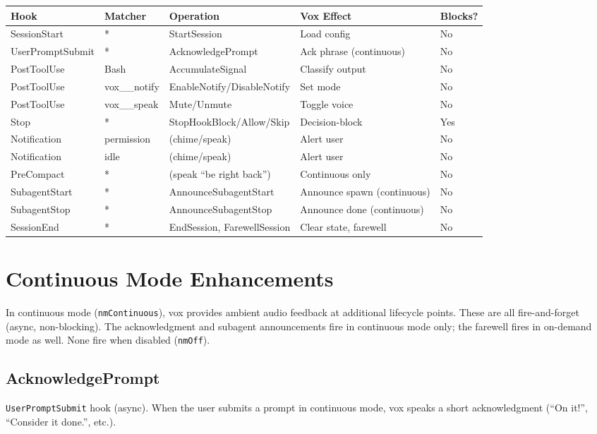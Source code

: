 \documentclass[a4paper,10pt,fleqn]{article}
\begin{document}
\begin{tabular}{lllll}
\hline
\textbf{Hook} & \textbf{Matcher} & \textbf{Operation} & \textbf{Vox Effect} & \textbf{Blocks?} \\
\hline
SessionStart & * & StartSession & Load config & No \\
UserPromptSubmit & * & AcknowledgePrompt & Ack phrase (continuous) & No \\
PostToolUse & Bash & AccumulateSignal & Classify output & No \\
PostToolUse & vox\_\_notify & EnableNotify/DisableNotify & Set mode & No \\
PostToolUse & vox\_\_speak & Mute/Unmute & Toggle voice & No \\
Stop & * & StopHookBlock/Allow/Skip & Decision-block & Yes \\
Notification & permission & (chime/speak) & Alert user & No \\
Notification & idle & (chime/speak) & Alert user & No \\
PreCompact & * & (speak ``be right back'') & Continuous only & No \\
SubagentStart & * & AnnounceSubagentStart & Announce spawn (continuous) & No \\
SubagentStop & * & AnnounceSubagentStop & Announce done (continuous) & No \\
SessionEnd & * & EndSession, FarewellSession & Clear state, farewell & No \\
\hline
\end{tabular}

\section{Continuous Mode Enhancements}

In continuous mode (\texttt{nmContinuous}), vox provides ambient
audio feedback at additional lifecycle points. These are all
fire-and-forget (async, non-blocking). The acknowledgment and
subagent announcements fire in continuous mode only; the farewell
fires in on-demand mode as well. None fire when disabled
(\texttt{nmOff}).

\subsection{AcknowledgePrompt}

\texttt{UserPromptSubmit} hook (async). When the user submits a
prompt in continuous mode, vox speaks a short acknowledgment
(``On it!'', ``Consider it done.'', etc.).
\end{document}
